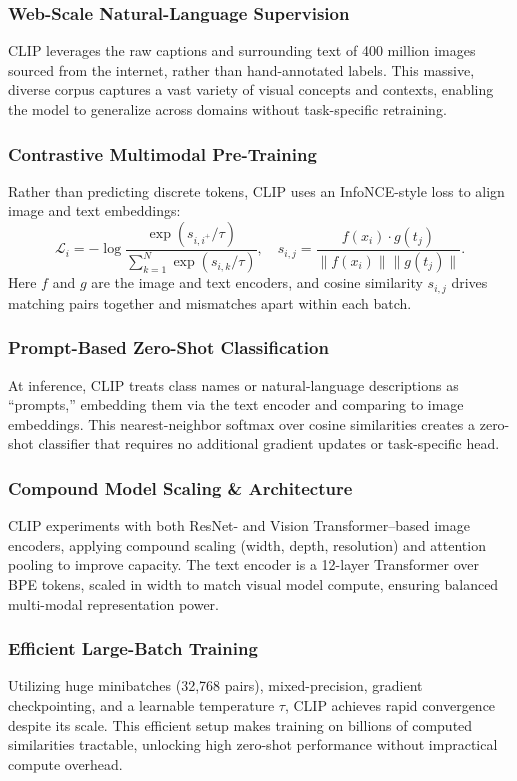 \documentclass[10pt]{article}
\begin{document}
\subsubsection*{Web-Scale Natural-Language Supervision}
CLIP leverages the raw captions and surrounding text of 400 million images sourced from the internet, rather than hand-annotated labels. This massive, diverse corpus captures a vast variety of visual concepts and contexts, enabling the model to generalize across domains without task-specific retraining.

\subsubsection*{Contrastive Multimodal Pre-Training}
Rather than predicting discrete tokens, CLIP uses an InfoNCE-style loss to align image and text embeddings:
\[
    \mathcal{L}_i = -\log \frac{\exp(s_{i,i^+}/\tau)}{\sum_{k=1}^N \exp(s_{i,k}/\tau)},
    \quad
    s_{i,j} = \frac{f(x_i)\cdot g(t_j)}{\|f(x_i)\|\|g(t_j)\|}.
\]
Here \(f\) and \(g\) are the image and text encoders, and cosine similarity \(s_{i,j}\) drives matching pairs together and mismatches apart within each batch.

\subsubsection*{Prompt-Based Zero-Shot Classification}
At inference, CLIP treats class names or natural-language descriptions as “prompts,” embedding them via the text encoder and comparing to image embeddings. This nearest-neighbor softmax over cosine similarities creates a zero-shot classifier that requires no additional gradient updates or task-specific head.

\subsubsection*{Compound Model Scaling \& Architecture}
CLIP experiments with both ResNet- and Vision Transformer–based image encoders, applying compound scaling (width, depth, resolution) and attention pooling to improve capacity. The text encoder is a 12-layer Transformer over BPE tokens, scaled in width to match visual model compute, ensuring balanced multi-modal representation power.

\subsubsection*{Efficient Large-Batch Training}
Utilizing huge minibatches (32,768 pairs), mixed-precision, gradient checkpointing, and a learnable temperature \(\tau\), CLIP achieves rapid convergence despite its scale. This efficient setup makes training on billions of computed similarities tractable, unlocking high zero-shot performance without impractical compute overhead.
\end{document}
